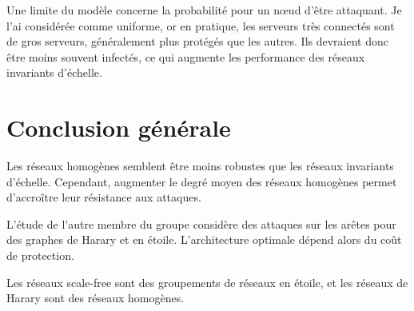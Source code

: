 \documentclass[12pt,a4paper]{article}
\begin{document}
Une limite du modèle concerne la probabilité pour un nœud d'être attaquant.
Je l'ai considérée comme uniforme, or en pratique, les serveurs très connectés sont de gros serveurs, généralement plus protégés que les autres.
Ils devraient donc être moins souvent infectés, ce qui augmente les performance des réseaux invariants d'échelle.



\section{Conclusion générale} %

Les réseaux homogènes semblent être moins robustes que les réseaux invariants d'échelle.
Cependant, augmenter le degré moyen des réseaux homogènes permet d'accroître leur résistance aux attaques.

L'étude de l'autre membre du groupe considère des attaques sur les arêtes pour des graphes de Harary et en étoile.
L'architecture optimale dépend alors du coût de protection.

Les réseaux scale-free sont des groupements de réseaux en étoile, et les réseaux de Harary sont des réseaux homogènes.

\end{document}
